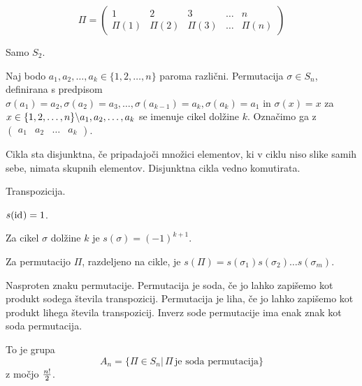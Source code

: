 \[
	\Pi = \begin{pmatrix}
		1 & 2 & 3 & \ldots & n \\
		\Pi(1) & \Pi(2) & \Pi(3) & \ldots & \Pi(n)
	\end{pmatrix}
\]


Samo $S_2$.


Naj bodo $a_1, a_2, \ldots, a_k \in \{1, 2, \ldots, n\}$ paroma različni. Permutacija $\sigma \in S_n$, definirana s predpisom $\sigma(a_1) = a_2, \sigma(a_2) = a_3, \ldots, \sigma(a_{k-1}) = a_k, \sigma(a_k) = a_1$ in $\sigma(x) = x$ za $x \in \{1, 2, \ldots, n\} \backslash {a_1, a_2, \ldots, a_k}$ se imenuje cikel dolžine $k$. Označimo ga z $\begin{pmatrix}
a_1 & a_2 & \ldots & a_k
\end{pmatrix}$.


Cikla sta disjunktna, če pripadajoči množici elementov, ki v ciklu niso slike samih sebe, nimata skupnih elementov. Disjunktna cikla vedno komutirata.


Transpozicija.


$s(\mathrm{id}_{} ) = 1$.

Za cikel $\sigma$ dolžine $k$ je $s(\sigma) = (-1)^{k+1}.$

Za permutacijo $\Pi$, razdeljeno na cikle, je $s(\Pi) = s(\sigma_1) s(\sigma_2) \ldots s(\sigma_m)$.


Nasproten znaku permutacije. Permutacija je soda, če jo lahko zapišemo kot produkt sodega števila transpozicij. Permutacija je liha, če jo lahko zapišemo kot produkt lihega števila transpozicij. Inverz sode permutacije ima enak znak kot soda permutacija.


To je grupa \[
	A_n = \{\Pi \in S_n | \, \Pi \, \text{je soda permutacija}\}
\] z močjo $n! \over 2$.

